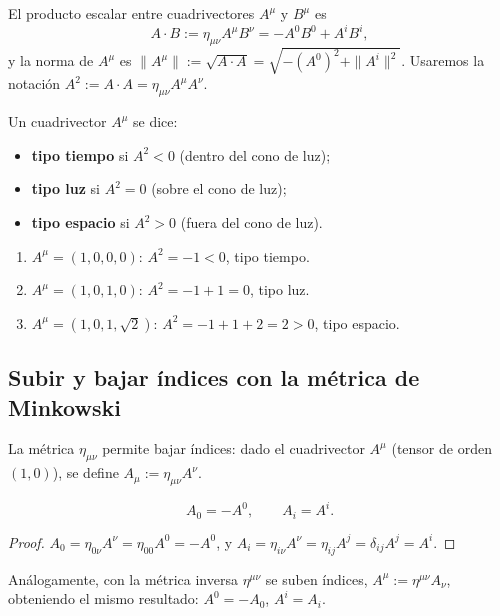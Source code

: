 \begin{definicion}
El producto escalar entre cuadrivectores $A^\mu$ y $B^\mu$ es
\[
A\cdot B := \eta_{\mu\nu}A^\mu B^\nu = -A^0B^0+A^iB^i,
\]
y la norma de $A^\mu$ es $\|A^\mu\| := \sqrt{A\cdot A} = \sqrt{-(A^0)^2+
\|A^i\|^2}$. Usaremos la notación $A^2 := A\cdot A = \eta_{\mu\nu}
A^\mu A^\nu$.
\end{definicion}

\begin{definicion}
Un cuadrivector $A^\mu$ se dice:
\begin{itemize}
\item \textbf{tipo tiempo} si $A^2<0$ (dentro del cono de luz);
\item \textbf{tipo luz} si $A^2=0$ (sobre el cono de luz);
\item \textbf{tipo espacio} si $A^2>0$ (fuera del cono de luz).
\end{itemize}
\end{definicion}

\begin{ejemplo}
\begin{enumerate}[label=\alph*)]
\item $A^\mu=(1,0,0,0)$: $A^2=-1<0$, tipo tiempo.
\item $A^\mu=(1,0,1,0)$: $A^2=-1+1=0$, tipo luz.
\item $A^\mu=(1,0,1,\sqrt2)$: $A^2=-1+1+2=2>0$, tipo espacio.
\end{enumerate}
\end{ejemplo}

\subsection{Subir y bajar índices con la métrica de Minkowski}

La métrica $\eta_{\mu\nu}$ permite bajar índices: dado el cuadrivector
$A^\mu$ (tensor de orden $(1,0)$), se define $A_\mu:=\eta_{\mu\nu}A^\nu$.

\begin{proposicionc}
\[
A_0 = -A^0, \qquad A_i = A^i .
\]
\end{proposicionc}

\begin{proof}
$A_0=\eta_{0\nu}A^\nu=\eta_{00}A^0=-A^0$, y $A_i=\eta_{i\nu}A^\nu=
\eta_{ij}A^j=\delta_{ij}A^j=A^i$. \qedhere
\end{proof}

Análogamente, con la métrica inversa $\eta^{\mu\nu}$ se suben índices,
$A^\mu:=\eta^{\mu\nu}A_\nu$, obteniendo el mismo resultado: $A^0=-A_0$,
$A^i=A_i$.


